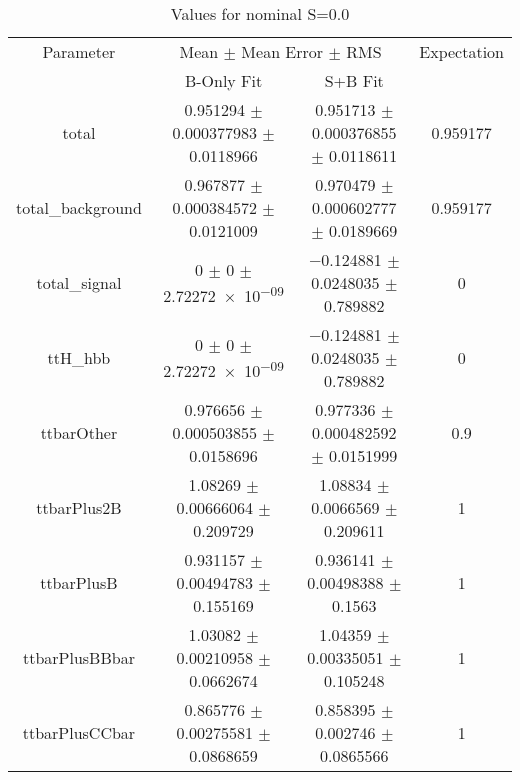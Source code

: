 \begin{table}
\centering
\caption{Values for nominal S=0.0}
\begin{tabular}{cccc}
\toprule
Parameter & \multicolumn{2}{c}{Mean $\pm$ Mean Error $\pm$ RMS} & Expectation\\
 & B-Only Fit & S+B Fit & \\
\midrule
total & \num{0.951294} $\pm$ \num{0.000377983} $\pm$ \num{0.0118966} & \num{0.951713} $\pm$ \num{0.000376855} $\pm$ \num{0.0118611} & \num{0.959177}\\
total\_background & \num{0.967877} $\pm$ \num{0.000384572} $\pm$ \num{0.0121009} & \num{0.970479} $\pm$ \num{0.000602777} $\pm$ \num{0.0189669} & \num{0.959177}\\
total\_signal & \num{0} $\pm$ \num{0} $\pm$ \num{2.72272e-09} & \num{-0.124881} $\pm$ \num{0.0248035} $\pm$ \num{0.789882} & \num{0}\\
ttH\_hbb & \num{0} $\pm$ \num{0} $\pm$ \num{2.72272e-09} & \num{-0.124881} $\pm$ \num{0.0248035} $\pm$ \num{0.789882} & \num{0}\\
ttbarOther & \num{0.976656} $\pm$ \num{0.000503855} $\pm$ \num{0.0158696} & \num{0.977336} $\pm$ \num{0.000482592} $\pm$ \num{0.0151999} & \num{0.9}\\
ttbarPlus2B & \num{1.08269} $\pm$ \num{0.00666064} $\pm$ \num{0.209729} & \num{1.08834} $\pm$ \num{0.0066569} $\pm$ \num{0.209611} & \num{1}\\
ttbarPlusB & \num{0.931157} $\pm$ \num{0.00494783} $\pm$ \num{0.155169} & \num{0.936141} $\pm$ \num{0.00498388} $\pm$ \num{0.1563} & \num{1}\\
ttbarPlusBBbar & \num{1.03082} $\pm$ \num{0.00210958} $\pm$ \num{0.0662674} & \num{1.04359} $\pm$ \num{0.00335051} $\pm$ \num{0.105248} & \num{1}\\
ttbarPlusCCbar & \num{0.865776} $\pm$ \num{0.00275581} $\pm$ \num{0.0868659} & \num{0.858395} $\pm$ \num{0.002746} $\pm$ \num{0.0865566} & \num{1}\\
\bottomrule
\end{tabular}
\end{table}